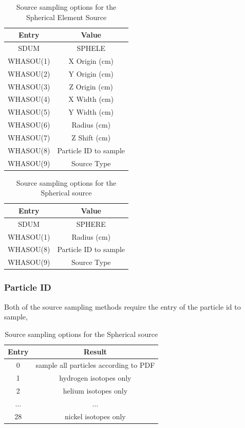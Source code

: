 \begin{table}[ht!]
 \begin{tabular}{c|c}
 Entry & Value \\
 \hline
 SDUM & SPHELE \\
 WHASOU(1) & X Origin (cm) \\
 WHASOU(2) & Y Origin (cm) \\
 WHASOU(3) & Z Origin (cm) \\
 WHASOU(4) & X Width  (cm) \\
 WHASOU(5) & Y Width  (cm) \\
 WHASOU(6) & Radius   (cm) \\
 WHASOU(7) & Z Shift  (cm) \\
 WHASOU(8) & Particle ID to sample \\
 WHASOU(9) & Source Type 
 \end{tabular}
\label{tab:sphele_source}
\caption{Source sampling options for the Spherical Element Source}
\end{table}

\begin{table}[ht!]
 \begin{tabular}{c|c}
 Entry & Value \\
 \hline
 SDUM & SPHERE \\
 WHASOU(1) & Radius (cm) \\
 WHASOU(8) & Particle ID to sample \\
 WHASOU(9) & Source Type 
 \end{tabular}
\label{tab:sphere_source}
\caption{Source sampling options for the Spherical source}
\end{table}

\subsubsection*{Particle ID}
Both of the source sampling methods require the entry of the particle id to sample,
\begin{table}[ht!]
 \begin{tabular}{c|c}
 Entry & Result \\
 \hline
 0  & sample all particles according to PDF \\
 1  & hydrogen isotopes only \\
 2  & helium isotopes only \\
 ... & ... \\
 28 & nickel isotopes only \\
 \end{tabular}
\label{tab:particleid}
\caption{Source sampling options for the Spherical source}
\end{table}

